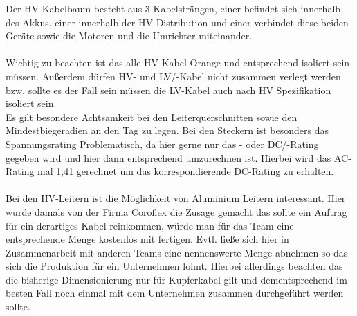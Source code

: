 Der HV Kabelbaum besteht aus 3 Kabelsträngen, einer befindet sich innerhalb des Akkus, einer innerhalb der \ac{HV}-Distribution und einer verbindet diese beiden Geräte sowie die Motoren und die Umrichter miteinander.\\
\\
Wichtig zu beachten ist das alle \ac{HV}-Kabel Orange und entsprechend isoliert sein müssen. Außerdem dürfen \ac{HV}- und \ac{LV}/-Kabel nicht zusammen verlegt werden bzw. sollte es der Fall sein müssen die \ac{LV}-Kabel auch nach \ac{HV} Spezifikation isoliert sein.\\
Es gilt besondere Achtsamkeit bei den Leiterquerschnitten sowie den Mindestbiegeradien an den Tag zu legen. Bei den Steckern ist besonders das Spannungsrating Problematisch, da hier gerne nur das - oder \ac{DC}/-Rating gegeben wird und hier dann entsprechend umzurechnen ist. Hierbei wird das \ac{AC}-Rating mal 1,41 gerechnet um das korrespondierende \ac{DC}-Rating zu erhalten. \\
\\
Bei den \ac{HV}-Leitern ist die Möglichkeit von Aluminium Leitern interessant. Hier wurde damals von der Firma Coroflex die Zusage gemacht das sollte ein Auftrag für ein derartiges Kabel reinkommen, würde man für das Team eine entsprechende Menge kostenlos mit fertigen. Evtl. ließe sich hier in Zusammenarbeit mit anderen Teams eine nennenswerte Menge abnehmen so das sich die Produktion für ein Unternehmen lohnt. Hierbei allerdings beachten das die bisherige Dimensionierung nur für Kupferkabel gilt und dementsprechend im besten Fall noch einmal mit dem Unternehmen zusammen durchgeführt werden sollte.\\
\\
